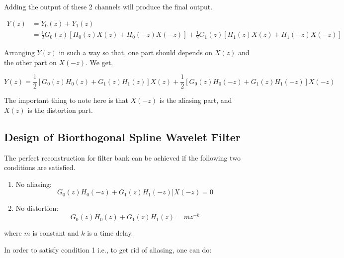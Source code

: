 Adding the output of these 2 channels will produce the final output.



\begin{equation} \label{eq1}
\begin{split}
Y(z)  &= Y_{0}(z) + Y_{1}(z) \\
&= \frac{1}{2}G_{0}(z)[H_{0}(z)X(z) + H_{0}(-z)X(-z)] + \frac{1}{2}G_{1}(z)[H_{1}(z)X(z) + H_{1}(-z)X(-z)]
\end{split}
\end{equation}


Arranging $Y(z)$ in such a way so that, one part should depends on $X(z)$ and the other part on $X(-z)$. We get,

\begin{equation} \label{eqn_wavelet_transform}
{Y(z) = \frac{1}{2}[G_{0}(z)H_{0}(z) + G_{1}(z)H_{1}(z)]X(z) + \frac{1}{2}[G_{0}(z)H_{0}(-z) + G_{1}(z)H_{1}(-z)]X(-z)}
\end{equation}

The important thing to note here is that $X(-z)$ is the aliasing part, and $X(z)$ is the distortion part.


\subsection{Design of Biorthogonal Spline Wavelet Filter}

The perfect reconstruction for filter bank can be achieved if the following two conditions are satisfied.

\begin{enumerate}
	\item No aliasing: 
	\begin{equation} 
	{G_{0}(z)H_{0}(-z) + G_{1}(z)H_{1}(-z)]X(-z) = 0}
	\end{equation}
	\item No distortion:
	\begin{equation} 
	{G_{0}(z)H_{0}(z) + G_{1}(z)H_{1}(z) = mz^{-k}}
	\end{equation}
\end{enumerate}


where $m$ is constant and $k$ is a time delay.

In order to satisfy condition 1 i.e., to get rid of aliasing, one can do:

